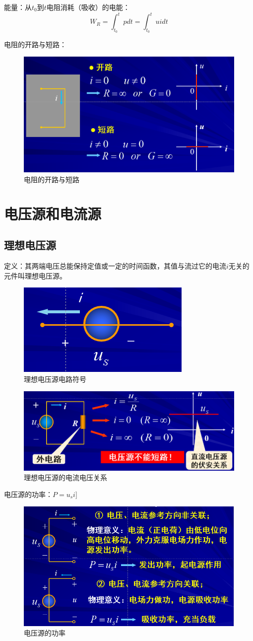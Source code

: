 \documentclass[11pt,a4paper,oneside]{book}
\begin{document}
能量：从$t_0$到$t$电阻消耗（吸收）的电能：
\begin{equation}
	W_R=\int_{t_0}^{t}pdt=\int_{t_0}^{t}uidt
\end{equation}

电阻的开路与短路：
\begin{figure}[H]
	\centering
	\includegraphics[width=0.7\linewidth]{screenshot113}
	\caption{电阻的开路与短路}
	\label{fig:screenshot113}
\end{figure}
\section{电压源和电流源}
\subsection{理想电压源}
定义：其两端电压总能保持定值或一定的时间函数，其值与流过它的电流$i$无关的元件叫理想电压源。
\begin{figure}[H]
	\centering
	\includegraphics[width=0.3\linewidth]{screenshot114}
	\caption{理想电压源电路符号}
	\label{fig:screenshot114}
\end{figure}
\begin{figure}[H]
	\centering
	\includegraphics[width=0.6\linewidth]{screenshot115}
	\caption{理想电压源的电流电压关系}
	\label{fig:screenshot115}
\end{figure}
电压源的功率：$P=u_si]$
\begin{figure}
	\centering
	\includegraphics[width=0.6\linewidth]{screenshot116}
	\caption{电压源的功率}
	\label{fig:screenshot116}
\end{figure}
\end{document}
